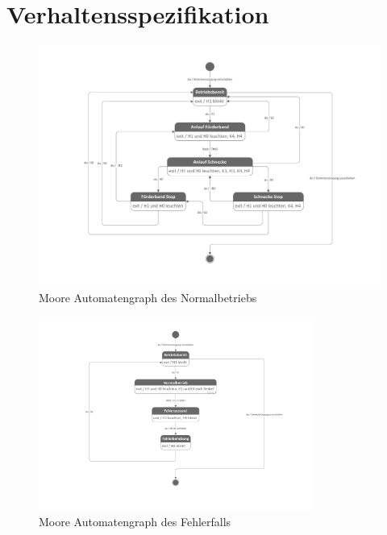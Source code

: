 \section{Verhaltensspezifikation}

\begin{figure}[H]
   \centering
   \includegraphics[width=1.0\textwidth]{Bilder/Normalbetrieb.pdf}
   \caption[Automatengraph Normalbetrieb]{Moore Automatengraph des Normalbetriebs}
   \label{fig:Bild4}
\end{figure}

\begin{figure}[H]
   \centering
   \includegraphics[width=0.8\textwidth]{Bilder/Fehlerfall.pdf}
   \caption[Automatengraph Fehlerfall]{Moore Automatengraph des Fehlerfalls}
   \label{fig:Bild5}
\end{figure}